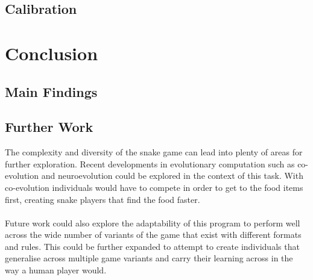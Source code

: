 \documentclass{article}
\begin{document}




\subsection{Calibration}

\section{Conclusion} %
\subsection{Main Findings}



\subsection{Further Work}
The complexity and diversity of the snake game can lead into plenty of areas for further exploration. Recent developments in evolutionary computation such as co-evolution and neuroevolution could be explored in the context of this task. With co-evolution individuals would have to compete in order to get to the food items first, creating snake players that find the food faster.
\\\\
Future work could also explore the adaptability of this program to perform well across the wide number of variants of the game that exist with different formats and rules. This could be further expanded to attempt to create individuals that generalise across multiple game variants and carry their learning across in the way a human player would.
\end{document}
